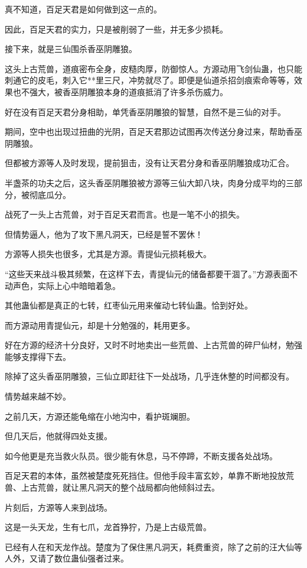 \begin{this_body}
真不知道，百足天君是如何做到这一点的。

因此，百足天君的实力，只是被削弱了一些，并无多少损耗。

接下来，就是三仙围杀香巫阴雕狼。

这头上古荒兽，道痕密布全身，皮糙肉厚，防御惊人。方源动用飞剑仙蛊，也只能刺通它的皮毛，刺入它**里三尺，冲势就尽了。即便是仙道杀招剑痕索命等等，效果也不强大，被香巫阴雕狼本身的道痕抵消了许多杀伤威力。

好在没有百足天君分身相助，单凭香巫阴雕狼的智慧，自然不是三仙的对手。

期间，空中也出现过扭曲的光阴，百足天君那边试图再次传送分身过来，帮助香巫阴雕狼。

但都被方源等人及时发现，提前狙击，没有让天君分身和香巫阴雕狼成功汇合。

半盏茶的功夫之后，这头香巫阴雕狼被方源等三仙大卸八块，肉身分成平均的三部分，被彻底瓜分。

战死了一头上古荒兽，对于百足天君而言。也是一笔不小的损失。

但情势逼人，他为了攻下黑凡洞天，已经是誓不罢休！

方源等人损失也很多，尤其是方源。青提仙元损耗极大。

“这些天来战斗极其频繁，在这样下去，青提仙元的储备都要干涸了。”方源表面不动声色，实际上心中暗暗着急。

其他蛊仙都是真正的七转，红枣仙元用来催动七转仙蛊。恰到好处。

而方源动用青提仙元，却是十分勉强的，耗用更多。

好在方源的经济十分良好，又时不时地卖出一些荒兽、上古荒兽的碎尸仙材，勉强能够支撑得下去。

除掉了这头香巫阴雕狼，三仙立即赶往下一处战场，几乎连休整的时间都没有。

情势越来越不妙。

之前几天，方源还能龟缩在小地沟中，看护斑斓胆。

但几天后，他就得四处支援。

如今他更是充当救火队员。很少能有休息，马不停蹄，不断支援各处战场。

百足天君的本体，虽然被楚度死死挡住。但他手段丰富玄妙，单靠不断地投放荒兽、上古荒兽，就让黑凡洞天的整个战局都向他倾斜过去。

片刻后，方源等人来到战场。

这是一头天龙，生有七爪，龙首狰狞，乃是上古级荒兽。

已经有人在和天龙作战。楚度为了保住黑凡洞天，耗费重资，除了之前的汪大仙等人外，又请了数位蛊仙强者过来。


\end{this_body}
